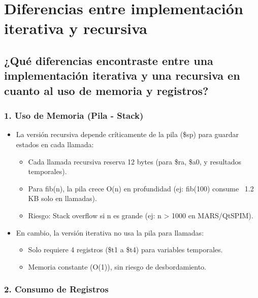 \documentclass{article}
\begin{document}
\section{Diferencias entre implementación iterativa y recursiva}

\subsection{¿Qué diferencias encontraste entre una implementación iterativa y una recursiva en cuanto al uso de memoria y registros?}

\subsubsection*{1. Uso de Memoria (Pila - Stack)}

\begin{itemize}[leftmargin=*]
    \item La versión recursiva depende críticamente de la pila (\$sp) para guardar estados en cada llamada:
    \begin{itemize}
        \item Cada llamada recursiva reserva 12 bytes (para \$ra, \$a0, y resultados temporales).
        \item Para fib(n), la pila crece O(n) en profundidad (ej: fib(100) consume ~1.2 KB solo en llamadas).
        \item Riesgo: Stack overflow si n es grande (ej: n > 1000 en MARS/QtSPIM).
    \end{itemize}
    
    \item En cambio, la versión iterativa no usa la pila para llamadas:
    \begin{itemize}
        \item Solo requiere 4 registros (\$t1 a \$t4) para variables temporales.
        \item Memoria constante (O(1)), sin riesgo de desbordamiento.
    \end{itemize}
\end{itemize}

\subsubsection*{2. Consumo de Registros}
\end{document}
